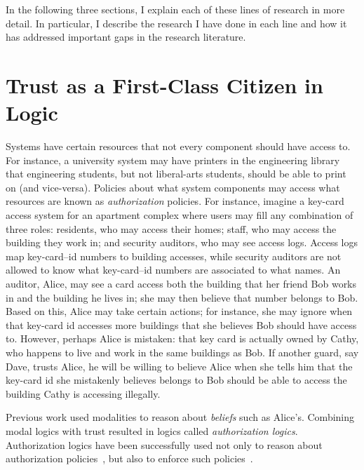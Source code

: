 \documentclass{article}
\theoremstyle{definition}
\begin{document}
\iffalse
In another line of work, I also use modalities to represent \emph{computational effects}, which are ways that programs interact with their environment other than receiving inputs and producing outputs.
In particular, I have used modalities to show that \textbf{evaluation order in programming languages can be explained by effect interactions.}
\fi

In the following three sections, I explain each of these lines of research in more detail.
In particular, I describe the research I have done in each line and how it has addressed important gaps in the research literature.

\section*{Trust as a First-Class Citizen in Logic}

Systems have certain resources that not every component should have access to.
For instance, a university system may have printers in the engineering library that engineering students, but not liberal-arts students, should be able to print on (and vice-versa).
Policies about what system components may access what resources are known as \emph{authorization} policies.
For instance, imagine a key-card access system for an apartment complex where users may fill any combination of three roles: residents, who may access their homes; staff, who may access the building they work in; and security auditors, who may see access logs.
Access logs map key-card--id numbers to building accesses, while security auditors are not allowed to know what key-card--id numbers are associated to what names.
An auditor, Alice, may see a card access both the building that her friend Bob works in and the building he lives in; she may then believe that number belongs to Bob.
Based on this, Alice may take certain actions; for instance, she may ignore when that key-card id accesses more buildings that she believes Bob should have access to.
However, perhaps Alice is mistaken: that key card is actually owned by Cathy, who happens to live and work in the same buildings as Bob.
If another guard, say Dave, trusts Alice, he will be willing to believe Alice when she tells him that the key-card id she mistakenly believes belongs to Bob should be able to access the building Cathy is accessing illegally.

Previous work used modalities to reason about \emph{beliefs} such as Alice's.
Combining modal logics with trust resulted in logics called \emph{authorization logics}.
Authorization logics have been successfully used not only to reason about authorization policies~\citep{Abadi06}, but also to enforce such policies~\cite{SchneiderWS11,SirerDBRSWWS11}.
\end{document}
